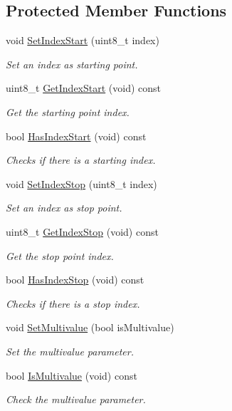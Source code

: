 \subsection*{Protected Member Functions}
\begin{DoxyCompactItemize}
\item 
void \hyperlink{classns3_1_1PbbTlv_ab694f311c0727b385edb6124aed671cf}{Set\+Index\+Start} (uint8\+\_\+t index)
\begin{DoxyCompactList}\small\item\em Set an index as starting point. \end{DoxyCompactList}\item 
uint8\+\_\+t \hyperlink{classns3_1_1PbbTlv_afdd989dcab3efa5f7e78a5a15fe17f68}{Get\+Index\+Start} (void) const 
\begin{DoxyCompactList}\small\item\em Get the starting point index. \end{DoxyCompactList}\item 
bool \hyperlink{classns3_1_1PbbTlv_a41146c67e4e544b5a4b4c19153cd5799}{Has\+Index\+Start} (void) const 
\begin{DoxyCompactList}\small\item\em Checks if there is a starting index. \end{DoxyCompactList}\item 
void \hyperlink{classns3_1_1PbbTlv_aa1b76790c014665aa25787fa57c3e92c}{Set\+Index\+Stop} (uint8\+\_\+t index)
\begin{DoxyCompactList}\small\item\em Set an index as stop point. \end{DoxyCompactList}\item 
uint8\+\_\+t \hyperlink{classns3_1_1PbbTlv_abe0c348b07511fb40d656c6392326960}{Get\+Index\+Stop} (void) const 
\begin{DoxyCompactList}\small\item\em Get the stop point index. \end{DoxyCompactList}\item 
bool \hyperlink{classns3_1_1PbbTlv_a9d94effbe915280069d7d9f9df82a936}{Has\+Index\+Stop} (void) const 
\begin{DoxyCompactList}\small\item\em Checks if there is a stop index. \end{DoxyCompactList}\item 
void \hyperlink{classns3_1_1PbbTlv_aa2f2d344c6f13542b9d299f0d4ee256e}{Set\+Multivalue} (bool is\+Multivalue)
\begin{DoxyCompactList}\small\item\em Set the multivalue parameter. \end{DoxyCompactList}\item 
bool \hyperlink{classns3_1_1PbbTlv_a85d68cdce0833c8285a07d13b05f0d2a}{Is\+Multivalue} (void) const 
\begin{DoxyCompactList}\small\item\em Check the multivalue parameter. \end{DoxyCompactList}\end{DoxyCompactItemize}
